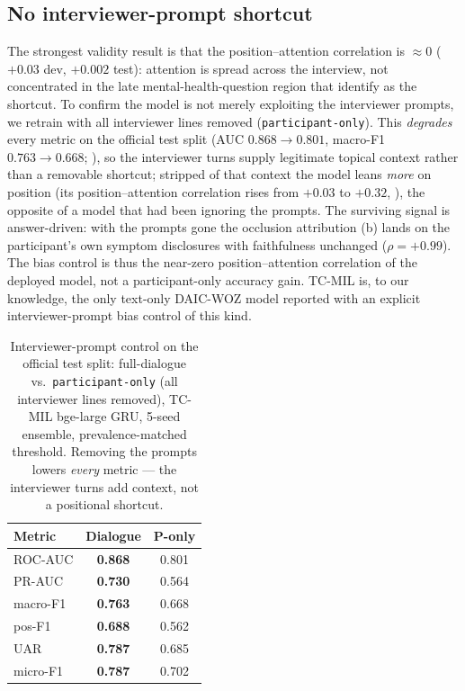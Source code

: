 \documentclass[conference]{IEEEtran}
\begin{document}
\subsection{No interviewer-prompt shortcut}
The strongest validity result is that the position--attention correlation is
$\approx$0 ($+0.03$ dev, $+0.002$ test): attention is spread across the
interview, not concentrated in the late mental-health-question region that
\cite{burdisso2024} identify as the shortcut. To confirm the model is not merely
exploiting the interviewer prompts, we retrain with all interviewer lines
removed (\texttt{participant-only}). This \emph{degrades} every metric on the
official test split (AUC $0.868\!\to\!0.801$, macro-F1 $0.763\!\to\!0.668$;
), so the interviewer turns supply legitimate topical context
rather than a removable shortcut; stripped of that context the model leans
\emph{more} on position (its position--attention correlation rises from $+0.03$
to $+0.32$, ), the opposite of a model that had been ignoring
the prompts. The surviving signal is answer-driven: with the prompts gone the
occlusion attribution (b) lands on the participant's own symptom
disclosures with faithfulness unchanged ($\rho=+0.99$). The bias control is thus
the near-zero position--attention correlation of the deployed model, not a
participant-only accuracy gain. TC-MIL is, to our knowledge, the only text-only
DAIC-WOZ model reported with an explicit interviewer-prompt bias control of this
kind.

\begin{table}[t]
\caption{Interviewer-prompt control on the official test split: full-dialogue
vs.\ \texttt{participant-only} (all interviewer lines removed), TC-MIL
bge-large GRU, 5-seed ensemble, prevalence-matched threshold. Removing the
prompts lowers \emph{every} metric --- the interviewer turns add context, not a
positional shortcut.}
\label{tab:ponly}
\centering
\small
\begin{tabular}{@{}lcc@{}}
\toprule
\textbf{Metric} & \textbf{Dialogue} & \textbf{P-only} \\
\midrule
ROC-AUC       & \textbf{0.868} & 0.801 \\
PR-AUC        & \textbf{0.730} & 0.564 \\
macro-F1      & \textbf{0.763} & 0.668 \\
pos-F1        & \textbf{0.688} & 0.562 \\
UAR           & \textbf{0.787} & 0.685 \\
micro-F1      & \textbf{0.787} & 0.702 \\
\bottomrule
\end{tabular}
\end{table}
\end{document}
